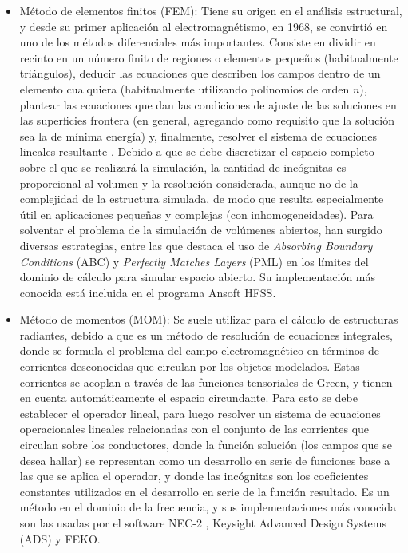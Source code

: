 \begin{itemize}
	\item Método de elementos finitos (FEM): Tiene su origen en el análisis estructural, y desde su primer aplicación al electromagnétismo, en 1968, se convirtió en uno de los métodos diferenciales más importantes. Consiste en dividir en recinto en un número finito de regiones o elementos pequeños (habitualmente triángulos), deducir las ecuaciones que describen los campos dentro de un elemento cualquiera (habitualmente utilizando polinomios de orden $n$), plantear las ecuaciones que dan las condiciones de ajuste de las soluciones en las superficies frontera (en general, agregando como requisito que la solución sea la de mínima energía) y, finalmente, resolver el sistema de ecuaciones lineales resultante \cite{Fernandez:Electromag}. Debido a que se debe discretizar el espacio completo sobre el que se realizará la simulación, la cantidad de incógnitas es proporcional al volumen y la resolución considerada, aunque no de la complejidad de la estructura simulada, de modo que resulta especialmente útil en aplicaciones pequeñas y complejas (con inhomogeneidades). Para solventar el problema de la simulación de volúmenes abiertos, han surgido diversas estrategias, entre las que destaca el uso de \textit{Absorbing Boundary Conditions} (ABC) y \textit{Perfectly Matches Layers} (PML) en los límites del dominio de cálculo para simular espacio abierto. Su implementación más conocida está incluida en el programa Ansoft HFSS.
	\item Método de momentos (MOM): Se suele utilizar para el cálculo de estructuras radiantes, debido a que es un método de resolución de ecuaciones integrales, donde se formula el problema del campo electromagnético en términos de corrientes desconocidas que circulan por los objetos modelados. Estas corrientes se acoplan a través de las funciones tensoriales de Green, y tienen en cuenta automáticamente el espacio circundante. Para esto se debe establecer el operador lineal, para luego resolver un sistema de ecuaciones operacionales lineales relacionadas con el conjunto de las corrientes que circulan sobre los conductores, donde la función solución (los campos que se desea hallar) se representan como un desarrollo en serie de funciones base a las que se aplica el operador, y donde las incógnitas son los coeficientes constantes utilizados en el desarrollo en serie de la función resultado. Es un método en el dominio de la frecuencia, y sus implementaciones más conocida son las usadas por el software NEC-2 \cite{Fernandez:Electromag}, Keysight Advanced Design Systems (ADS) y FEKO.

\end{itemize}
